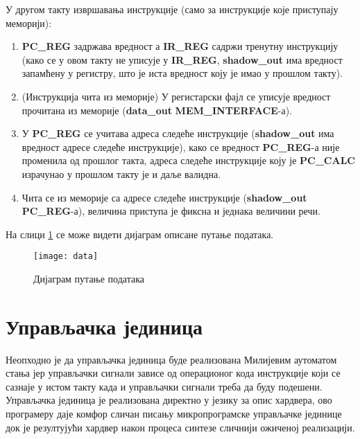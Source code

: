 У другом такту извршавања инструкције (само за инструкције које приступају меморији):

\begin{enumerate}
	\item \textbf{PC\_REG} задржава вредност а \textbf{IR\_REG} садржи тренутну инструкцију (како се у овом такту не уписује у \textbf{IR\_REG}, \textbf{shadow\_out} има вредност запамћену у регистру, што је иста вредност коју је имао у прошлом такту).
	\item (Инструкција чита из меморије) У регистарски фајл се уписује вредност прочитана из меморије (\textbf{data\_out} \textbf{MEM\_INTERFACE}-а).
	\item У \textbf{PC\_REG} се учитава адреса следеће инструкције (\textbf{shadow\_out} има вредност адресе следеће инструкције), како се вредност \textbf{PC\_REG}-а није променила од прошлог такта, адреса следеће инструкције коју је \textbf{PC\_CALC} израчунао у прошлом такту је и даље валидна.
	\item Чита се из меморије са адресе следеће инструкције (\textbf{shadow\_out} \textbf{PC\_REG}-а), величина приступа је фиксна и једнака величини речи.
	
\end{enumerate}

На слици \ref{fig:data} се може видети дијаграм описане путање података. \newpage

\begin{figure}[h!]
	\centering
	\texttt{[image: data]}
	\caption{Дијаграм путање података}
	\label{fig:data}
\end{figure}

\section{Управљачка јединица}

Неопходно је да управљачка јединица буде реализована Милијевим аутоматом стања јер управљачки сигнали зависе од операционог кода инструкције који се сазнаје у истом такту када и управљачки сигнали треба да буду подешени. Управљачка јединица је реализована директно у језику за опис хардвера, ово програмеру даје комфор сличан писању микропрограмске управљачке јединице док је резултујући хардвер након процеса синтезе сличнији ожиченој реализацији.



